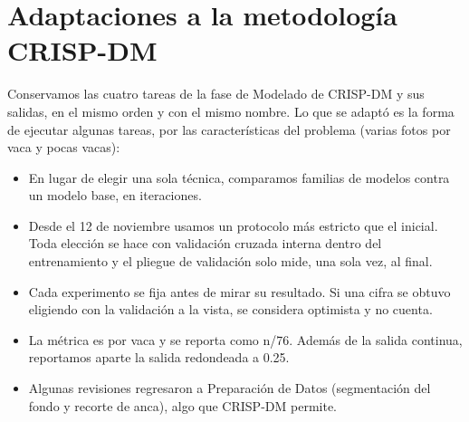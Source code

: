 \section*{Adaptaciones a la metodología CRISP-DM}

Conservamos las cuatro tareas de la fase de Modelado de CRISP-DM y sus salidas, en el mismo orden y con el mismo nombre. Lo que se adaptó es la forma de ejecutar algunas tareas, por las características del problema (varias fotos por vaca y pocas vacas):

\begin{itemize}
  \item En lugar de elegir una sola técnica, comparamos familias de modelos contra un modelo base, en iteraciones.
  \item Desde el 12 de noviembre usamos un protocolo más estricto que el inicial. Toda elección se hace con validación cruzada interna dentro del entrenamiento y el pliegue de validación solo mide, una sola vez, al final.
  \item Cada experimento se fija antes de mirar su resultado. Si una cifra se obtuvo eligiendo con la validación a la vista, se considera optimista y no cuenta.
  \item La métrica es por vaca y se reporta como n/76. Además de la salida continua, reportamos aparte la salida redondeada a 0.25.
  \item Algunas revisiones regresaron a Preparación de Datos (segmentación del fondo y recorte de anca), algo que CRISP-DM permite.
\end{itemize}
